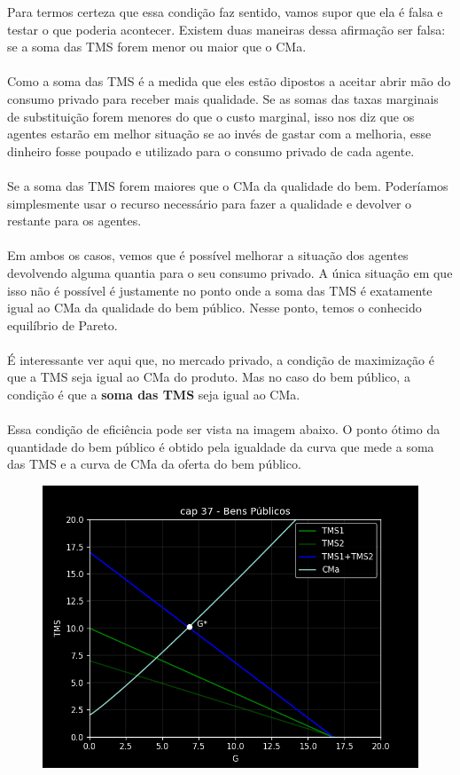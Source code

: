 \documentclass[a4paper,11pt,oneside]{book}
\theoremstyle{definition}
\theoremstyle{break}
\begin{document}
Para termos certeza que essa condição faz sentido, vamos supor que ela é falsa e testar o que poderia acontecer. Existem duas maneiras dessa afirmação ser falsa: se a soma das TMS forem menor ou maior que o CMa.
\\~\\
Como a soma das TMS é a medida que eles estão dipostos a aceitar abrir mão do consumo privado para receber mais qualidade. Se as somas das taxas marginais de substituição forem menores do que o custo marginal, isso nos diz que os agentes estarão em melhor situação se ao invés de gastar com a melhoria, esse dinheiro fosse poupado e utilizado para o consumo privado de cada agente.
\\~\\
Se a soma das TMS forem maiores que o CMa da qualidade do bem. Poderíamos simplesmente usar o recurso necessário para fazer a qualidade e devolver o restante para os agentes.
\\~\\
Em ambos os casos, vemos que é possível melhorar a situação dos agentes devolvendo alguma quantia para o seu consumo privado. A única situação em que isso não é possível é justamente no ponto onde a soma das TMS é exatamente igual ao CMa da qualidade do bem público. Nesse ponto, temos o conhecido equilíbrio de Pareto.
\\~\\
É interessante ver aqui que, no mercado privado, a condição de maximização é que a TMS seja igual ao CMa do produto. Mas no caso do bem público, a condição é que a \textbf{soma das TMS} seja igual ao CMa.
\\~\\
Essa condição de eficiência pode ser vista na imagem abaixo. O ponto ótimo da quantidade do bem público é obtido pela igualdade da curva que mede a soma das TMS e a curva de CMa da oferta do bem público.

\begin{figure}[H]
	\centering
	\includegraphics[scale=0.55]{cap37_4-bem_publico.png}
\end{figure}
\end{document}

